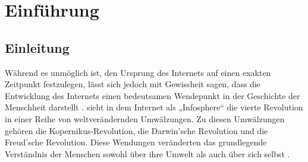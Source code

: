 \documentclass[a4paper]{scrartcl}
\begin{document}
\listoffigures


\newpage

\listoftables


\newpage

\setcounter{page}{1}


\section{Einführung}

\subsection{Einleitung}
Während es unmöglich ist, den Ursprung des Internets auf einen exakten Zeitpunkt festzulegen, lässt sich jedoch mit Gewissheit sagen, dass die Entwicklung des Internets einen bedeutsamen Wendepunkt in der Geschichte der Menschheit darstellt \autocite[26]{Kleinrock}. \textcite{Floridi} sieht in dem Internet als „Infosphere“ \autocite[9]{Floridi} die vierte Revolution in einer Reihe von weltverändernden Umwälzungen. Zu diesen Umwälzungen gehören die Kopernikus-Revolution, die Darwin'sche Revolution und die Freud'sche Revolution. Diese Wendungen veränderten das grundlegende Verständnis der Menschen sowohl über ihre Umwelt als auch über sich selbst \autocite[8f.]{Floridi}. \\
\end{document}
